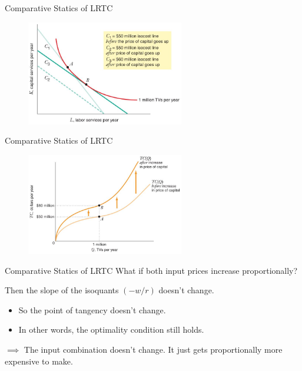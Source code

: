 \documentclass[11pt,t]{beamer}
\begin{document}
\begin{frame}{Comparative Statics of LRTC}
  \begin{figure}
    \includegraphics[width=260px]{figures/fig8_3.jpg}
  \end{figure}
\end{frame}

\begin{frame}{Comparative Statics of LRTC}
  \begin{figure}
    \includegraphics[width=260px]{figures/fig8_4.jpg}
  \end{figure}
\end{frame}

\begin{frame}{Comparative Statics of LRTC}
  What if both input prices increase proportionally?

  \bigskip\pause
  Then the slope of the isoquants $(-w/r)$ doesn't change.

  \begin{itemize}
    \item So the point of tangency doesn't change.
    
    \item In other words, the optimality condition still holds.
  \end{itemize}

  \bigskip\pause
  $\implies$ The input combination doesn't change. It just gets proportionally more expensive to make.
\end{frame}
\end{document}
